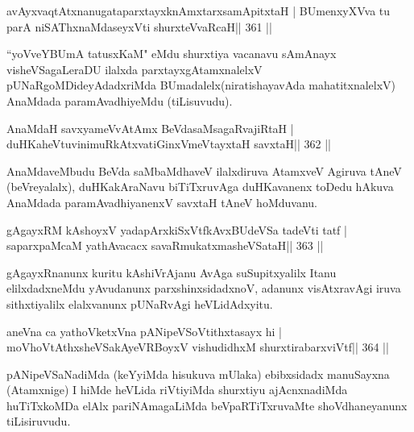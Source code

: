 \begin{shl}
avAyxvaqtAtxnanugataparxtayxknAmxtarxsamApitxtaH |
BUmenxyXVva tu parA niSAThx\s\s naMdaseyxVti shurxteVvaRcaH\hfill || 361 ||
\end{shl}

\begin{artha}
``yoVveYBUmA tatusxKaM" eMdu shurxtiya vacanavu sAmAnayx  visheVSagaLeraDU ilalxda parxtayxgAtamxnalelxV pUNaRgoMDideyAdadxriMda  BUmadalelx\break (niratishayavAda mahatitxnalelxV) AnaMdada paramAvadhiyeMdu (tiLisuvudu).
\end{artha}


\begin{shl}
AnaMdaH savxyameVvA\s\s tAmx BeVdasaMsagaRvajiRtaH |
duHKaheVtuvinimuRkAtxvatiGinxVmeVtayxtaH savxtaH\hfill || 362 ||
\end{shl}

\begin{artha}
AnaMdaveMbudu BeVda saMbaMdhaveV ilalxdiruva AtamxveV Agiruva tAneV (beVreyalalx), duHKakAraNavu biTiTxruvAga duHKavanenx toDedu hAkuva AnaMdada paramAvadhiyanenxV savxtaH tAneV hoMduvanu.
\end{artha}


\begin{shl}
gAgayxRM kAshoyxV yadapArxkiSxVtfkAvxBUdeVSa tadeVti tatf |
saparxpaMcaM yathAvacacx savaRmukatxmasheVSataH\hfill || 363 ||
\end{shl}

\begin{artha}
gAgayxRnanunx kuritu kAshiVrAjanu AvAga suSupitxyalilx Itanu elilxdadxneMdu yAvudanunx parxshinxsidadxnoV, adanunx visAtxravAgi iruva sithxtiyalilx elalxvanunx pUNaRvAgi heVLidAdxyitu.
\end{artha}


\begin{shl}
aneVna ca yathoVketxVna pANipeVSoVtithxtasayx hi |
moVhoVtAthxsheVSakAyeVRBoyxV vishudidhxM shurxtirabarxviVtf\hfill || 364 ||
\end{shl}

\begin{artha}
pANipeVSaNadiMda (keYyiMda hisukuva mUlaka) ebibxsidadx manuSayxna (Atamxnige) I hiMde heVLida riVtiyiMda shurxtiyu ajAcnxnadiMda huTiTxkoMDa elAlx pariNAmagaLiMda beVpaRTiTxruvaMte shoVdhaneyanunx tiLisiruvudu.
\end{artha}

